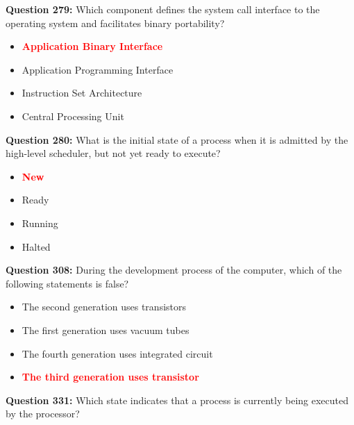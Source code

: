 \documentclass[12pt,a4paper]{article}
\begin{document}
\vspace{0.5cm}

\textbf{Question 279:} Which component defines the system call interface to the operating system and facilitates binary portability?

\begin{itemize}
    \item[\textbf{A.}] \textcolor{red}{\textbf{Application Binary Interface}}
    \item[\textbf{B.}] Application Programming Interface
    \item[\textbf{C.}] Instruction Set Architecture
    \item[\textbf{D.}] Central Processing Unit
\end{itemize}

\vspace{0.5cm}

\textbf{Question 280:} What is the initial state of a process when it is admitted by the high-level scheduler, but not yet ready to execute?

\begin{itemize}
    \item[\textbf{A.}] \textcolor{red}{\textbf{New}}
    \item[\textbf{B.}] Ready
    \item[\textbf{C.}] Running
    \item[\textbf{D.}] Halted
\end{itemize}

\vspace{0.5cm}

\textbf{Question 308:} During the development process of the computer, which of the following statements is false?

\begin{itemize}
    \item[\textbf{A.}] The second generation uses transistors
    \item[\textbf{B.}] The first generation uses vacuum tubes
    \item[\textbf{C.}] The fourth generation uses integrated circuit
    \item[\textbf{D.}] \textcolor{red}{\textbf{The third generation uses transistor}}
\end{itemize}

\vspace{0.5cm}

\textbf{Question 331:} Which state indicates that a process is currently being executed by the processor?
\end{document}
